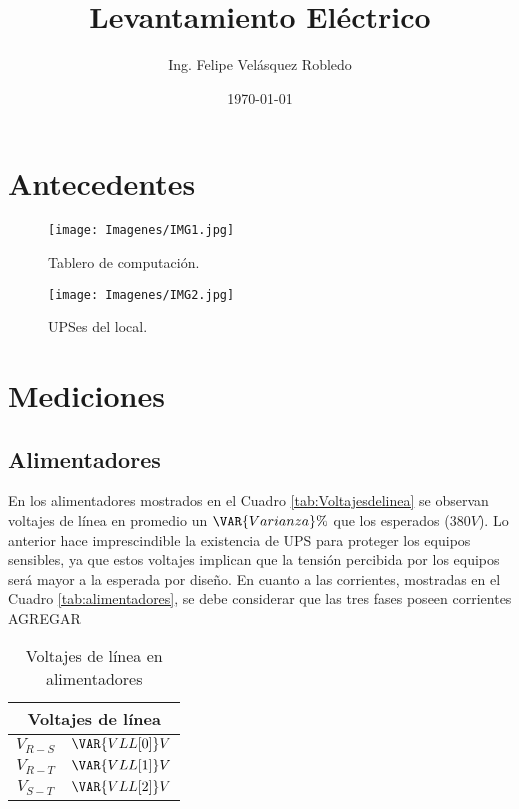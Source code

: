 \documentclass{article}
\title{Levantamiento Eléctrico\\\VAR{ID_Local}}
\author{Ing. Felipe Velásquez Robledo}
\date{\today}
\begin{document}
\maketitle
\pagestyle{fancy}
\thispagestyle{fancy}
\begin{abstract}
\end{abstract}
\section{Antecedentes}

\begin{figure}
\centering
\texttt{[image: Imagenes/IMG1.jpg]}
\caption{\label{fig:Tablero}Tablero de computación.}
\end{figure}

\begin{figure}
\centering
\texttt{[image: Imagenes/IMG2.jpg]}
\caption{\label{fig:UPSes}UPSes del local.}
\end{figure}


\section{Mediciones}
\subsection{Alimentadores}
En los alimentadores mostrados en el Cuadro  \ref{tab:Voltajesdelinea} se observan voltajes de línea en promedio un $ \VAR{Varianza}\% $  que los esperados ($380V$). Lo anterior hace imprescindible la existencia de UPS para proteger los equipos sensibles, ya que estos voltajes implican que la tensión percibida por los equipos será mayor a la esperada por diseño.
En cuanto a las corrientes, mostradas en el Cuadro \ref{tab:alimentadores}, se debe considerar que las tres fases poseen corrientes AGREGAR


\begin{center}
    \begin{table}[H]
        \centering
        \begin{tabular}{c c}
        \multicolumn{2}{c}{Voltajes de línea}\\\hline
             $V_{R-S}$ & $\VAR{VLL[0]} V$ \\
             $V_{R-T}$ & $\VAR{VLL[1]} V$ \\
             $V_{S-T}$ & $\VAR{VLL[2]} V$ \\
        \end{tabular}
        \caption{Voltajes de línea en alimentadores}
        \label{tab:Voltajesdelínea}
    \end{table}
\end{center}
\end{document}
